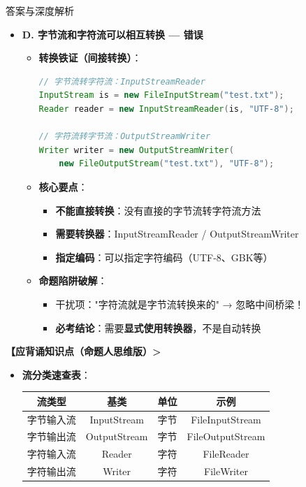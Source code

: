 \documentclass[12pt, a4paper]{ctexart}
\begin{document}
\begin{bluebox}{答案与深度解析}
\begin{itemize}[label={}, nosep]
		\item \textbf{D. 字节流和字符流可以相互转换 — 错误}
		\begin{itemize}[label={}, leftmargin=*, nosep]
			\item \textbf{转换铁证（间接转换）}：
			      \begin{lstlisting}[language=Java]
// 字节流转字符流：InputStreamReader
InputStream is = new FileInputStream("test.txt");
Reader reader = new InputStreamReader(is, "UTF-8");

// 字符流转字节流：OutputStreamWriter
Writer writer = new OutputStreamWriter(
    new FileOutputStream("test.txt"), "UTF-8");
      \end{lstlisting}

			\item \textbf{核心要点}：
			      \begin{itemize}[label={}, nosep]
				      \item \textbf{不能直接转换}：没有直接的字节流转字符流方法
				      \item \textbf{需要转换器}：InputStreamReader / OutputStreamWriter
				      \item \textbf{指定编码}：可以指定字符编码（UTF-8、GBK等）
			      \end{itemize}

			\item \textbf{命题陷阱破解}：
			      \begin{itemize}[label={}, nosep]
				      \item 干扰项："字符流就是字节流转换来的" → 忽略中间桥梁！
				      \item \textbf{必考结论}：需要\textbf{显式使用转换器}，不是自动转换
			      \end{itemize}
		\end{itemize}
	\end{itemize}

	\textbf{【应背诵知识点（命题人思维版）>}
	\begin{itemize}[label={}, nosep]
		\item \textbf{流分类速查表}：
		      \begin{center}
			      \begin{tabular}{|c|c|c|c|}
				      \hline
				      \textbf{流类型} & \textbf{基类}  & \textbf{单位} & \textbf{示例}      \\
				      \hline
				      字节输入流        & InputStream  & 字节          & FileInputStream  \\
				      \hline
				      字节输出流        & OutputStream & 字节          & FileOutputStream \\
				      \hline
				      字符输入流        & Reader       & 字符          & FileReader       \\
				      \hline
				      字符输出流        & Writer       & 字符          & FileWriter       \\
				      \hline
			      \end{tabular}
		      \end{center}


\end{itemize}
\end{bluebox}
\end{document}
